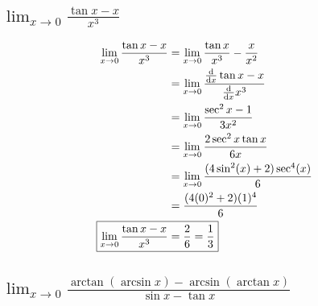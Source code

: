 \documentclass[]{article}
\begin{document}
\subsection{
    $\lim_{x \to 0} \frac{\tan{x} - x}{x^3}$
}

\begin{align*}
    \lim_{x \to 0} \frac{\tan{x} - x}{x^3}
        &= \lim_{x \to 0} \frac{\tan{x}}{x^3} - \frac{x}{x^2}\\
        &= \lim_{x \to 0} 
            \frac{\dv{x} \tan{x} - x}{\dv{x} x^3}\\
        &= \lim_{x \to 0}
            \frac{\sec^2{x} - 1}{3 x^2}\\
        &= \lim_{x \to 0}
            \frac{2 \sec^2{x}\tan{x}}{6 x}\\
        &= \lim_{x \to 0}
            \frac{(4 \sin[2](x) + 2) \sec[4](x)}{6}\\
        &= \frac{(4 (0)^2 + 2) (1)^4}{6}\\
    \Aboxed{
        \lim_{x \to 0} \frac{\tan{x} - x}{x^3}
        &= \frac{2}{6} = \frac{1}{3}
    }
\end{align*}

\newpage
\subsection{
    $\lim_{x \to 0} \frac{\arctan(\arcsin{x}) - \arcsin(\arctan{x})}{\sin{x} - \tan{x}}$
}
\end{document}
